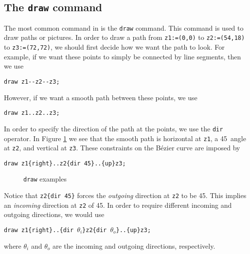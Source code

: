 \subsection{The \texttt{draw} command}

The most common command in \MP{} is the \texttt{draw} command.  This command is used to draw paths or pictures.  In order to draw a path from \texttt{z1:=(0,0)} to \texttt{z2:=(54,18)} to \texttt{z3:=(72,72)}, we should first decide how we want the path to look.  For example, if we want these points to simply be connected by line segments, then we use \begin{center}\verb|draw z1--z2--z3;|\end{center}  However, if we want a smooth path between these points, we use \begin{center}\verb|draw z1..z2..z3;|\end{center}  In order to specify the direction of the path at the points, we use the \texttt{dir} operator.  In Figure \ref{fig:draw1} we see that the smooth path is horizontal at \texttt{z1}, a 45\textdegree\ angle at \texttt{z2}, and vertical at \texttt{z3}.  These constraints on the B\'{e}zier curve are imposed by \begin{center}\verb|draw z1{right}..z2{dir 45}..{up}z3;|\end{center}
\begin{figure}[hptb]
	\begin{center}\end{center}
	\caption{\texttt{draw} examples}\label{fig:draw1}
\end{figure}
Notice that \verb|z2{dir 45}| forces the \textit{outgoing} direction at \texttt{z2} to be 45\textdegree.  This implies an \textit{incoming} direction at \texttt{z2} of 45\textdegree.  In order to require different incoming and outgoing directions, we would use \begin{center}\verb|draw z1{right}..{dir |$\theta_i$\verb|}z2{dir |$\theta_o$\verb|}..{up}z3;|\end{center} where $\theta_i$ and $\theta_o$ are the incoming and outgoing directions, respectively.
